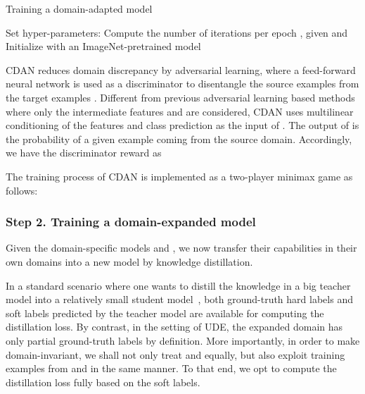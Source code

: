 \begin{algorithm}
\caption{Training a domain-adapted model }
\label{alg:da}
\KwIn{, }
\KwOut{}
Set hyper-parameters: \;
Compute the number of iterations per epoch , given  and  \;
Initialize {} with an ImageNet-pretrained model\;
\end{algorithm}
 





CDAN reduces domain discrepancy by adversarial learning, where a feed-forward neural network is used as a discriminator  to disentangle the source examples  from the target examples . Different from previous adversarial learning based methods where only the intermediate features  and  are considered, CDAN uses multilinear conditioning of the features and class prediction  as the input of . The output of  is the probability of a given example coming from the source domain. Accordingly, we have the discriminator reward  as 
 
The training process of CDAN is implemented as a two-player minimax game as follows:
















\subsubsection{Step 2. Training a domain-expanded model }

Given the domain-specific models  and , we now transfer their capabilities in their own domains into a new model  by knowledge distillation. 

In a standard scenario where one wants to distill the knowledge in a big teacher model into a relatively small student model~\cite{nips15-kd}, both ground-truth hard labels and soft labels predicted by the teacher model are available for computing the distillation loss. By contrast, in the setting of UDE, the expanded domain has only partial ground-truth labels by definition. More importantly, in order to make  domain-invariant, we shall not only treat  and  equally, but also exploit training examples from  and  in the same manner. To that end, we opt to compute the distillation loss fully based on the soft labels. 

